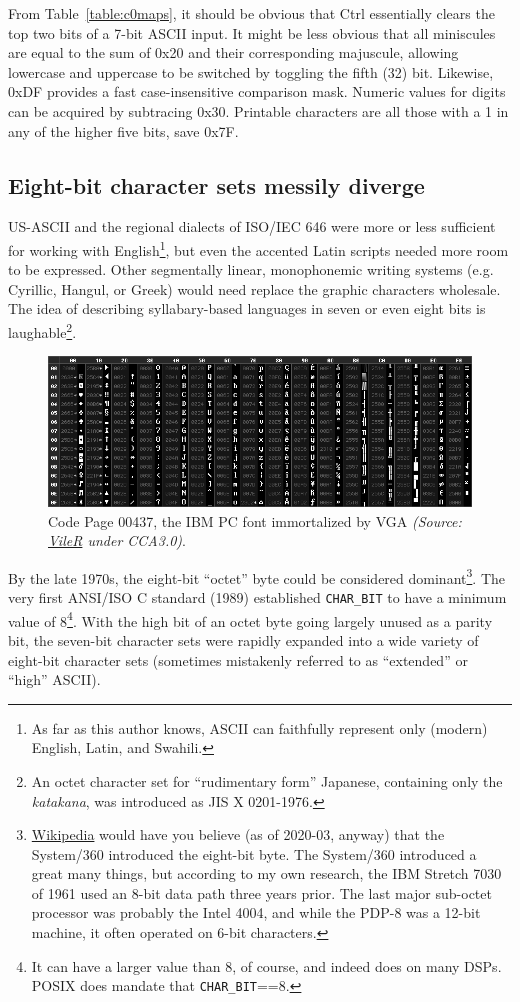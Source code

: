 \documentclass[letterpaper,10pt]{article}
\begin{document}
From Table~\ref{table:c0maps}, it should be obvious that Ctrl essentially clears
the top two bits of a 7-bit ASCII input. It might be less obvious that all
miniscules are equal to the sum of 0x20 and their corresponding majuscule,
allowing lowercase and uppercase to be switched by toggling the fifth (32) bit.
Likewise, 0xDF provides a fast case-insensitive comparison mask. Numeric values
for digits can be acquired by subtracing 0x30. Printable characters are all
those with a 1 in any of the higher five bits, save 0x7F.

\subsection{Eight-bit character sets messily diverge}
US-ASCII and the regional dialects of ISO/IEC 646 were more or less sufficient
for working with English\footnote{As far as this author knows, ASCII
can faithfully represent only (modern) English, Latin, and Swahili.}, but even
the accented Latin scripts needed more room to be expressed. Other
segmentally linear, monophonemic writing systems (e.g. Cyrillic, Hangul, or
Greek) would need replace the graphic characters wholesale. The idea of
describing syllabary-based languages in seven or even eight bits is
laughable\footnote{An octet character set for ``rudimentary form'' Japanese,
containing only the \textit{katakana}, was introduced as JIS X 0201-1976.}.

\begin{figure}[!htb]
  \centering
  \includegraphics[width=.5\linewidth]{media/chart437.png}
  \caption[The legendary Code Page 00437.]{Code Page 00437, the IBM PC font immortalized by VGA \textit{(Source: \href{https://int10h.org/oldschool-pc-fonts/readme/}{VileR} under CCA3.0)}.}
  \label{fig:cp437}
\end{figure}

By the late 1970s, the eight-bit ``octet'' byte could be considered
dominant\footnote{\href{https://en.wikipedia.org/wiki/8-bit\_computing}{Wikipedia}
would have you believe (as of 2020-03, anyway) that the System/360 introduced
the eight-bit byte. The System/360 introduced a great many things, but
according to my own research, the IBM Stretch 7030 of 1961 used an 8-bit data
path three years prior\cite{ibmstretch}. The last major sub-octet processor
was probably the Intel 4004, and while the PDP-8 was a 12-bit machine, it
often operated on 6-bit characters.}. The very first ANSI/ISO C standard
(1989) established \texttt{CHAR\_BIT} to have a minimum value of 8\footnote{It
can have a larger value than 8, of course, and indeed does on many
DSPs\cite{cookcharbit}. POSIX does mandate that \texttt{CHAR\_BIT}==8.}. With
the high bit of an octet byte going largely unused as a parity bit, the
seven-bit character sets were rapidly expanded into a wide variety of eight-bit
character sets (sometimes mistakenly referred to as ``extended'' or ``high''
ASCII).
\end{document}
